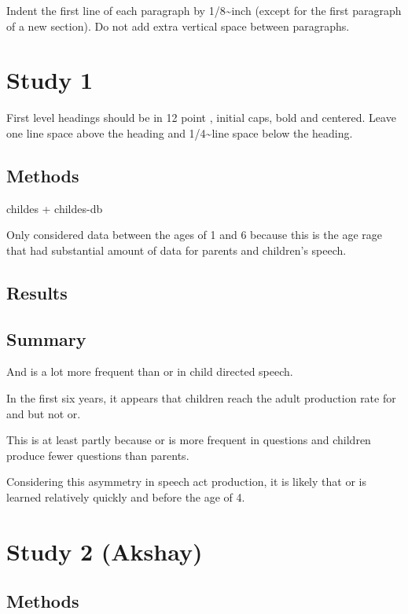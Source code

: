 \documentclass[10pt, letterpaper]{article}
\begin{document}
Indent the first line of each paragraph by 1/8\textasciitilde{}inch
(except for the first paragraph of a new section). Do not add extra
vertical space between paragraphs.

\section{Study 1}\label{study-1}

First level headings should be in 12 point , initial caps, bold and
centered. Leave one line space above the heading and
1/4\textasciitilde{}line space below the heading.

\subsection{Methods}\label{methods}

childes + childes-db

Only considered data between the ages of 1 and 6 because this is the age
rage that had substantial amount of data for parents and children's
speech.

\subsection{Results}\label{results}

\subsection{Summary}\label{summary}

And is a lot more frequent than or in child directed speech.

In the first six years, it appears that children reach the adult
production rate for and but not or.

This is at least partly because or is more frequent in questions and
children produce fewer questions than parents.

Considering this asymmetry in speech act production, it is likely that
or is learned relatively quickly and before the age of 4.

\section{Study 2 (Akshay)}\label{study-2-akshay}

\subsection{Methods}\label{methods-1}
\end{document}
